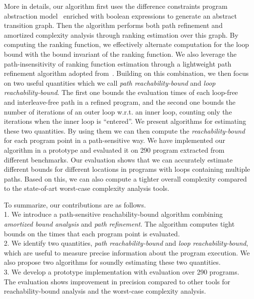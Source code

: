 More in details, our algorithm first uses the difference constraints program abstraction model~\cite{SinnZV17,SinnZV14} enriched with boolean expressions to generate an abstract transition graph.
Then the algorithm performs both path refinement and amortized complexity analysis through ranking estimation over this graph.
By computing the ranking function, we effectively alternate computation for the loop bound with the bound invariant of the ranking function. 
We also leverage the path-insensitivity of ranking function estimation through a lightweight path refinement algorithm adopted from~\cite{GulwaniJK09}.
Building on this combination, we then focus on two useful quantities which we call \emph{path reachability-bound} and \emph{loop reachability-bound}.
The first one bounds the evaluation times of each loop-free and interleave-free path in a refined program, and the second one bounds the number of iterations of an outer loop w.r.t. an inner loop, counting only the iterations when the inner loop is ``entered''. 
We present algorithms for estimating these two quantities. By using them we can then 
compute the \emph{reachability-bound} for each program point in a path-sensitive way.
We have implemented our algorithm in a prototype and evaluated it on 290 program extracted from different benchmarks. Our evaluation %
shows that we can accurately estimate different bounds for different locations in programs with loops containing multiple paths. Based on this, we can also compute a tighter overall complexity compared to the state-of-art worst-case complexity analysis tools.

To summarize, our contributions are as follows.
\\
1. We introduce a path-sensitive reachability-bound algorithm 
combining \emph{amortized bound analysis}  and \emph{path refinement}. The algorithm computes tight bounds on the times that each program point is evaluated.
\\
2. We identify two quantities,  \emph{path reachability-bound} and \emph{loop reachability-bound}, which are useful to measure precise information about the program execution.  We also propose two algorithms for soundly estimating these two quantities.
\\
3. We develop a prototype implementation with evaluation over 290 programs.
 The evaluation shows improvement in precision compared to other tools for reachability-bound analysis and the worst-case complexity analysis.

